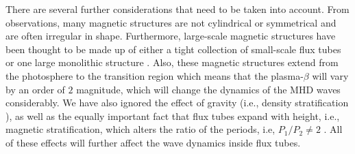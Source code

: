     There are several further considerations that need to be taken into account.
    From observations, many magnetic structures are not cylindrical or symmetrical and are often irregular in shape.
    Furthermore, large-scale magnetic structures have been thought to be made up of either a tight collection of small-scale flux tubes or one large monolithic structure \citep[][and the references within]{priest1984solar}.
    Also, these magnetic structures extend from the photosphere to the transition region which means that the plasma-$\beta$ will vary by an order of $2$ magnitude, which will change the dynamics of the MHD waves considerably.
    We have also ignored the effect of gravity (i.e., density stratification \citealt{2006A&A...458..975D,2011ApJ...743..164A}), as well as the equally important fact that flux tubes expand with height, i.e., magnetic stratification, which alters the ratio of the periods, i.e, $P_{1}/P_{2}\neq2$ \citep{luna-cardozo}. 
    All of these effects will further affect the wave dynamics inside flux tubes.
    
